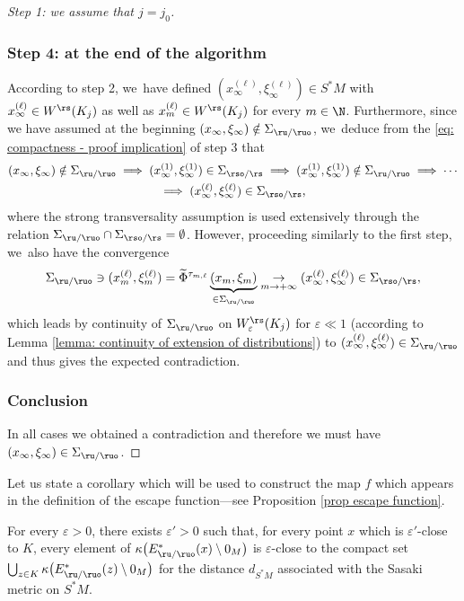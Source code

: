 \begin{proof}[Step 1: we assume that $j = j_0$]
\subsubsection*{Step 4: at the end of the algorithm}
According to step 2, we~have defined $(x_{\infty}^{(\ell)}, \xi_{\infty}^{(\ell)}) \in S^*M$ with $x_{\infty}^{(\ell)} \in W^\rs (K_j)$ as well as $x_{m}^{(\ell)} \in W^\rs (K_j)$ for every $m \in \N$. Furthermore, since we have assumed at the beginning $(x_{\infty},\xi_{\infty}) \notin \Sigma_{\ru/\ruo}$, we~deduce from the \eqref{eq: compactness - proof implication} of step 3 that\vspace*{-5pt}
\begin{multline*}
(x_{\infty},\xi_{\infty}) \notin \Sigma_{\ru/\ruo} \implies (x_{\infty}^{(1)}, \xi_{\infty}^{(1)}) \in \Sigma_{\rso/\rs} \implies (x_{\infty}^{(1)}, \xi_{\infty}^{(1)}) \notin \Sigma_{\ru/\ruo} \implies \cdots \\
\implies (x_{\infty}^{(\ell)}, \xi_{\infty}^{(\ell)}) \in \Sigma_{\rso/\rs},
\end{multline*}
where the strong transversality assumption is used extensively through the relation $\Sigma_{\ru/\ruo} \cap \Sigma_{\rso/\rs} = \emptyset$. However, proceeding similarly to the first step, we~also have the convergence\vspace*{-3pt}\enlargethispage{.5\baselineskip}
\[
\Sigma_{\ru/\ruo} \ni (x_m^{(\ell)},\xi_m^{(\ell)}) = \widetilde{\Phi}^{\tau_{m,\ell}} \underbrace{(x_m,\xi_m)}_{\in \Sigma_{\ru/\ruo}} \underset{m \to +\infty}{\to} (x_{\infty}^{(\ell)}, \xi_{\infty}^{(\ell)}) \in \Sigma_{\rso/\rs},
\]
which leads by continuity of $\Sigma_{\ru/\ruo}$ on $W_{\varepsilon}^\rs (K_j)$ for $\varepsilon \ll 1$ (according to Lemma \ref{lemma: continuity of extension of distributions}) to $(x_{\infty}^{(\ell)}, \xi_{\infty}^{(\ell)}) \in \Sigma_{\ru/\ruo}$ and thus gives the expected contradiction.

\subsubsection*{Conclusion}
In all cases we obtained a contradiction and therefore we must have $(x_{\infty},\xi_{\infty}) \in \Sigma_{\ru/\ruo}$.
\end{proof}

Let us state a corollary which will be used to construct the map $f$ which appears in the definition of the escape function---see Proposition \ref{prop escape function}.

\begin{corollary}\label{Corollary compactness proposition}
For every $\varepsilon > 0$, there exists $\varepsilon' > 0$ such that, for every point $x$ which is $\varepsilon'$-close to $K$, every element of $\kappa \bigl(E_{\ru/\ruo}^* (x) \setminus 0_M\bigr)$ is $\varepsilon$-close to the compact set $\bigcup_{z \in K} \kappa\bigl(E_{\ru/\ruo}^* (z)\setminus 0_M \bigr)$ for the distance $d_{S^*M}$ associated with the Sasaki metric on $S^*M$.
\end{corollary}

